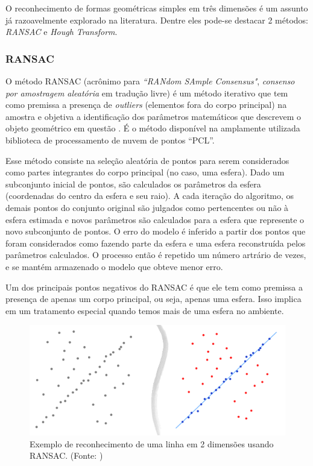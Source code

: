 O reconhecimento de formas geométricas simples em três dimensões é um assunto
já razoavelmente explorado na literatura. Dentre eles pode-se destacar 2
métodos: \textit{RANSAC} e \textit{Hough Transform}.

\subsubsection{RANSAC}
O método RANSAC (acrônimo para \textit{``RANdom SAmple Consensus"},
\textit{consenso por amostragem aleatória} em tradução livre) é um método iterativo que tem como
premissa a presença de \textit{outliers} (elementos fora do corpo principal) na
amostra e objetiva a identificação dos parâmetros matemáticos que descrevem o
objeto geométrico em questão \cite{ransac}. É o método
disponível na amplamente utilizada biblioteca de processamento de nuvem de pontos ``PCL''. 


Esse método consiste na seleção aleatória de pontos para serem considerados como
partes integrantes do corpo principal (no caso, uma esfera). Dado um subconjunto
inicial de pontos, são calculados os parâmetros da esfera (coordenadas do centro
da esfera e seu raio). A cada iteração do algoritmo, os demais pontos do
conjunto original são julgados como pertencentes ou não à esfera estimada e
novos parâmetros são calculados para a esfera que represente o novo subconjunto
de pontos. O erro do modelo é inferido
a partir dos pontos que foram considerados como fazendo parte da esfera e uma esfera reconstruída pelos parâmetros calculados. O processo
então é repetido um número artrário de vezes, e se mantém armazenado o modelo
que obteve menor erro.

Um dos principais pontos negativos do RANSAC é que ele tem como premissa a
presença de apenas um corpo principal, ou seja, apenas uma esfera. Isso implica
em um tratamento especial quando temos mais de uma esfera no ambiente.

\begin{figure}[h!]
   \centering
   \includegraphics[width=0.95\columnwidth]{method/figs/calibracao/ransac}
   \caption{Exemplo de reconhecimento de uma linha em 2 dimensões usando
   RANSAC. (Fonte: \cite{ransac})}
   \label{fig::ransac}
\end{figure}
 
